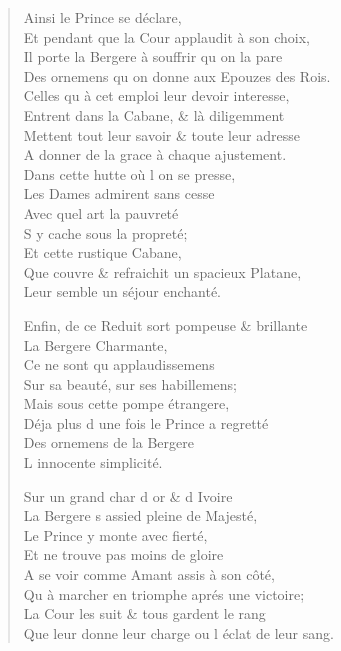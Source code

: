 \begin{verse}
\vin Ainsi le Prince se déclare, \\
Et pendant que la Cour applaudit à son choix, \\
Il porte la Bergere à souffrir qu\textquotesingle{} on la pare \\
Des ornemens qu\textquotesingle{} on donne aux Epouzes des Rois. \\
Celles qu\textquotesingle{} à cet emploi leur devoir interesse, \\
Entrent dans la Cabane, \& là diligemment \\
Mettent tout leur savoir \& toute leur adresse \\
\vin A donner de la grace à chaque ajustement. \\
\vin Dans cette hutte où l\textquotesingle{} on se presse, \\
\vin Les Dames admirent sans cesse \\
\vin Avec quel art la pauvreté \\
\vin S\textquotesingle{} y cache sous la propreté; \\
\vin Et cette rustique Cabane, \\
Que couvre \& refraichit un spacieux Platane, \\
\vin Leur semble un séjour enchanté.

Enfin, de ce Reduit sort pompeuse \& brillante \\
\vin La Bergere Charmante, \\
\vin Ce ne sont qu\textquotesingle{} applaudissemens \\
\vin Sur sa beauté, sur ses habillemens; \\
\vin Mais sous cette pompe étrangere, \\
Déja plus d\textquotesingle{} une fois le Prince a regretté \\
\vin Des ornemens de la Bergere \\
\vin L\textquotesingle{} innocente simplicité.

\vin Sur un grand char d\textquotesingle{} or \& d\textquotesingle{} Ivoire \\
La Bergere s\textquotesingle{} assied pleine de Majesté, \\
\vin Le Prince y monte avec fierté, \\
\vin Et ne trouve pas moins de gloire \\
A se voir comme Amant assis à son côté, \\
Qu\textquotesingle{} à marcher en triomphe aprés une victoire; \\
\vin La Cour les suit \& tous gardent le rang \\
Que leur donne leur charge ou l\textquotesingle{} éclat de leur sang.


\end{verse}
